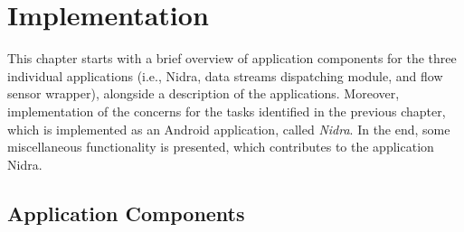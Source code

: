 \chapter{Implementation}
This chapter starts with a brief overview of application components for the three individual applications (i.e., Nidra, data streams dispatching module, and flow sensor wrapper), alongside a description of the applications. Moreover, implementation of the concerns for the tasks identified in the previous chapter, which is implemented as an Android application, called \textit{Nidra}. In the end, some miscellaneous functionality is presented, which contributes to the application Nidra. 

\section{Application Components} \label{impl:appcomp}

